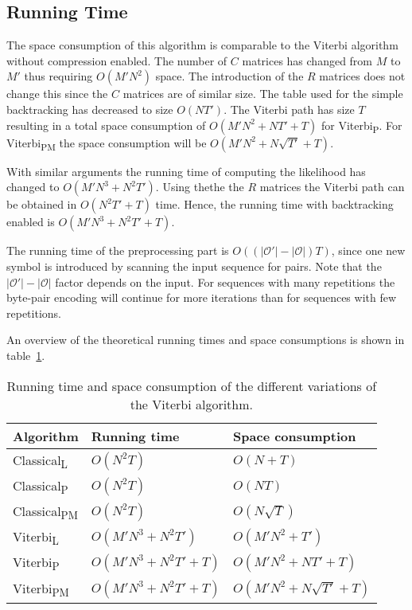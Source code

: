 \subsection{Running Time}
\label{sec:running-time}

The space consumption of this algorithm is comparable to the Viterbi algorithm
without compression enabled. The number of $C$ matrices has changed from $M$ to
$M'$ thus requiring $O(M' N^2)$ space. The introduction of the $R$ matrices
does not change this since the $C$ matrices are of similar size. The table used
for the simple backtracking has decreased to size $O(N T')$. The Viterbi path
has size $T$ resulting in a total space consumption of $O(M' N^2 + N T' + T)$
for Viterbi\textsubscript{P}. For Viterbi\textsubscript{PM} the space
consumption will be $O(M' N^2 + N \sqrt{T'} + T)$.

With similar arguments the running time of computing the likelihood has changed
to $O(M' N^3 +N^2 T')$. Using thethe the $R$ matrices the Viterbi path can be
obtained in $O(N^2 T' + T)$ time. Hence, the running time with backtracking
enabled is $O(M' N^3 +N^2 T' + T)$.

The running time of the preprocessing part is $O(
(
  \lvert\mathcal{O'}\rvert - \lvert{\mathcal{O}}\rvert
) T)$, since one new symbol is introduced by scanning the input sequence for
pairs. Note that the $\lvert\mathcal{O'}\rvert - \lvert{\mathcal{O}}\rvert$
factor depends on the input. For sequences with many repetitions the byte-pair
encoding will continue for more iterations than for sequences with few
repetitions.

An overview of the theoretical running times and space consumptions is shown in
table~\ref{tab:running-time}.

\begin{table}
  \centering
  \caption{Running time and space consumption of the different variations of the
    Viterbi algorithm.}
  \label{tab:running-time}
  \begin{tabular}{lll}
    \toprule
    Algorithm                   & Running time             & Space consumption             \\
    \midrule
    Classical\textsubscript{L}  & $O(N^2 T)$               & $O(N + T)$                    \\
    Classical\textsubscript{P}  & $O(N^2 T)$               & $O(NT)$                       \\
    Classical\textsubscript{PM} & $O(N^2 T)$               & $O(N\sqrt{T})$                \\
    Viterbi\textsubscript{L}    & $O(M' N^3 + N^2 T')$     & $O(M' N^2 + T')$              \\
    Viterbi\textsubscript{P}    & $O(M' N^3 + N^2 T' + T)$ & $O(M' N^2 + N T' + T)$        \\
    Viterbi\textsubscript{PM}   & $O(M' N^3 + N^2 T' + T)$ & $O(M' N^2 + N \sqrt{T'} + T)$ \\
    \bottomrule
  \end{tabular}
\end{table}

